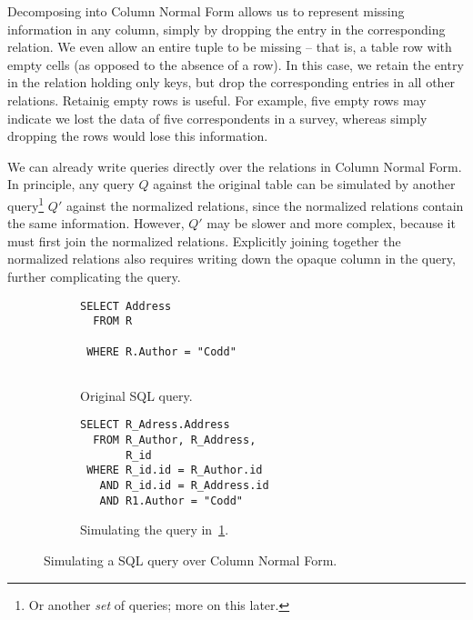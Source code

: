 \documentclass[sigconf,nonacm]{acmart}
\begin{document}
Decomposing into Column Normal Form allows us to
 represent missing information in any column,
 simply by dropping the entry in the corresponding relation.
We even allow an entire tuple to be missing --
 that is, a table row with empty cells (as opposed to the absence of a row).
In this case, we retain the entry in the relation holding only keys, 
 but drop the corresponding entries in all other relations.
Retainig empty rows is useful.
For example, five empty rows may indicate we lost the data
 of five correspondents in a survey, 
 whereas simply dropping the rows would lose this information.

We can already write queries directly over the relations in Column Normal Form. 
In principle, any query $Q$ against the original table 
 can be simulated by another query\footnote{Or another {\em set} of queries; more on this later.}
 $Q'$ against the normalized relations, 
 since the normalized relations contain the same information.
However, $Q'$ may be slower and more complex,
 because it must first join the normalized relations.
Explicitly joining together the normalized relations
 also requires writing down the opaque column
 in the query, further complicating the query.

\begin{figure}
\begin{subfigure}[t]{0.4\linewidth}
\begin{lstlisting}[showlines=true]
SELECT Address 
  FROM R 

 WHERE R.Author = "Codd"


\end{lstlisting}
\caption{Original SQL query.}
\label{fig:codd}
\end{subfigure}
\;
\begin{subfigure}[t]{0.5\linewidth}
\begin{lstlisting}
SELECT R_Adress.Address 
  FROM R_Author, R_Address,
       R_id
 WHERE R_id.id = R_Author.id 
   AND R_id.id = R_Address.id
   AND R1.Author = "Codd"
\end{lstlisting}
\caption{Simulating the query in~\ref{fig:codd}.}
\label{fig:codd-simulate}
\end{subfigure}
\caption{Simulating a SQL query over Column Normal Form.}
\label{fig:simulate}
\end{figure}
\end{document}
